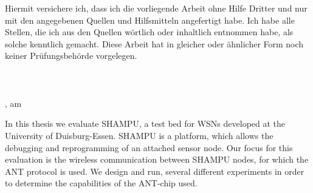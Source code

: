 Hiermit versichere ich, dass ich die vorliegende Arbeit ohne Hilfe Dritter und nur mit den angegebenen Quellen und
Hilfsmitteln angefertigt habe. Ich habe alle Stellen, die ich aus den Quellen wörtlich oder inhaltlich entnommen habe,
als solche kenntlich gemacht. Diese Arbeit hat in gleicher oder ähnlicher Form noch keiner Prüfungsbehörde vorgelegen.\\
\\
\\
\\
\ort, am \datum

In this thesis we evaluate SHAMPU, a test bed for WSNs developed at the University of Duisburg-Essen. 
SHAMPU is a platform, which allows the debugging and reprogramming of an attached sensor node.
Our focus for this evaluation is the wireless communication between SHAMPU nodes, for which the ANT protocol is used. 
We design and run, several different experiments in order to determine the capabilities of the ANT-chip used.
